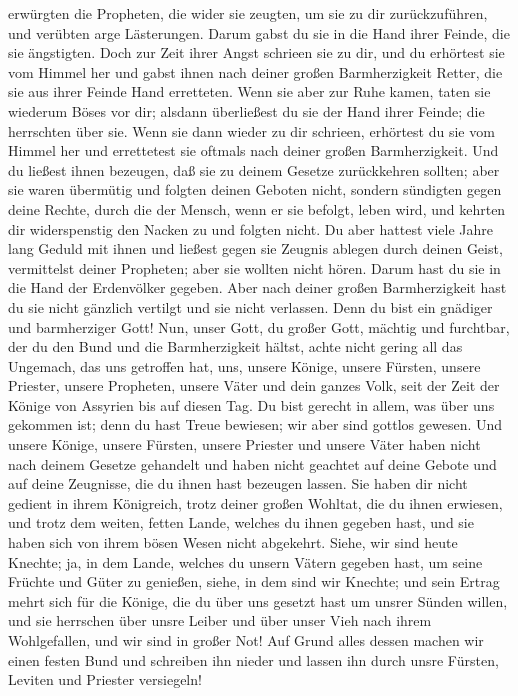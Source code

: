 erwürgten die Propheten, die wider sie zeugten, um sie zu dir
zurückzuführen, und verübten arge Lästerungen.  Darum
gabst du sie in die Hand ihrer Feinde, die sie ängstigten. Doch zur Zeit
ihrer Angst schrieen sie zu dir, und du erhörtest sie vom Himmel her und
gabst ihnen nach deiner großen Barmherzigkeit Retter, die sie aus ihrer
Feinde Hand erretteten.  Wenn sie aber zur Ruhe kamen,
taten sie wiederum Böses vor dir; alsdann überließest du sie der Hand
ihrer Feinde; die herrschten über sie. Wenn sie dann wieder zu dir
schrieen, erhörtest du sie vom Himmel her und errettetest sie oftmals
nach deiner großen Barmherzigkeit.  Und du ließest ihnen
bezeugen, daß sie zu deinem Gesetze zurückkehren sollten; aber sie waren
übermütig und folgten deinen Geboten nicht, sondern sündigten gegen
deine Rechte, durch die der Mensch, wenn er sie befolgt, leben wird, und
kehrten dir widerspenstig den Nacken zu und folgten nicht.
 Du aber hattest viele Jahre lang Geduld mit ihnen und
ließest gegen sie Zeugnis ablegen durch deinen Geist, vermittelst deiner
Propheten; aber sie wollten nicht hören. Darum hast du sie in die Hand
der Erdenvölker gegeben.  Aber nach deiner großen
Barmherzigkeit hast du sie nicht gänzlich vertilgt und sie nicht
verlassen. Denn du bist ein gnädiger und barmherziger Gott!
 Nun, unser Gott, du großer Gott, mächtig und furchtbar,
der du den Bund und die Barmherzigkeit hältst, achte nicht gering all
das Ungemach, das uns getroffen hat, uns, unsere Könige, unsere Fürsten,
unsere Priester, unsere Propheten, unsere Väter und dein ganzes Volk,
seit der Zeit der Könige von Assyrien bis auf diesen Tag.
 Du bist gerecht in allem, was über uns gekommen ist;
denn du hast Treue bewiesen; wir aber sind gottlos gewesen.
 Und unsere Könige, unsere Fürsten, unsere Priester und
unsere Väter haben nicht nach deinem Gesetze gehandelt und haben nicht
geachtet auf deine Gebote und auf deine Zeugnisse, die du ihnen hast
bezeugen lassen.  Sie haben dir nicht gedient in ihrem
Königreich, trotz deiner großen Wohltat, die du ihnen erwiesen, und
trotz dem weiten, fetten Lande, welches du ihnen gegeben hast, und sie
haben sich von ihrem bösen Wesen nicht abgekehrt.  Siehe,
wir sind heute Knechte; ja, in dem Lande, welches du unsern Vätern
gegeben hast, um seine Früchte und Güter zu genießen, siehe, in dem sind
wir Knechte;  und sein Ertrag mehrt sich für die Könige,
die du über uns gesetzt hast um unsrer Sünden willen, und sie herrschen
über unsre Leiber und über unser Vieh nach ihrem Wohlgefallen, und wir
sind in großer Not!  Auf Grund alles dessen machen wir
einen festen Bund und schreiben ihn nieder und lassen ihn durch unsre
Fürsten, Leviten und Priester versiegeln!

